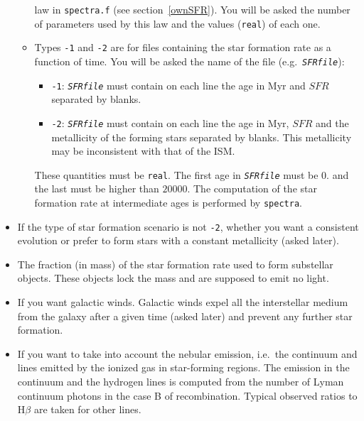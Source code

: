 \documentclass[11pt,draft,fleqn]{article}
\newcommand{\SFR}{\textit{SFR}}
\begin{document}
\begin{itemize}
\begin{itemize}
law in \texttt{spectra.f} (see section~\ref{ownSFR}). You will be asked the number of parameters used by this
law and the values (\texttt{real}) of each one.
\item Types \texttt{-1} and \texttt{-2} are for files containing the star formation rate as 
a function of time. You will be asked the name of the file (e.g.\ \texttt{\emph{SFRfile}}):
\begin{itemize}
\item \texttt{-1}: \texttt{\emph{SFRfile}} must contain on each line the age in Myr
and $\SFR$ separated by blanks.
\item \texttt{-2}: \texttt{\emph{SFRfile}} must contain on each line the age in
Myr, $\SFR$ and the metallicity of the forming stars 
separated by blanks. This metallicity may be inconsistent with
that of the ISM.
\end{itemize}
These quantities must be \texttt{real}.
The first age in \texttt{\emph{SFRfile}} must be $0.$ and the last must be
higher than $20000$.
The computation of the star formation rate at intermediate ages is performed by \texttt{spectra}.
\end{itemize}
\item If the type of star formation scenario is not \texttt{-2},
whether you want a consistent evolution or prefer to form stars 
with a constant metallicity (asked later).
\item The fraction (in mass) of the star formation rate used to form
substellar objects. These objects lock the mass and are supposed to emit no light.
\item If you want galactic winds. Galactic winds expel all the
interstellar medium from the galaxy
after a given time (asked later) and prevent any further star formation.
\item If you want to take into account the nebular emission, i.e.\ the continuum and lines emitted
by the ionized gas in star-forming regions. 
The emission in the continuum and the hydrogen lines is computed 
from the number of Lyman continuum photons
in the case B of recombination.
Typical observed ratios to H${\beta}$ are taken for other lines. 


\end{itemize}
\end{document}
